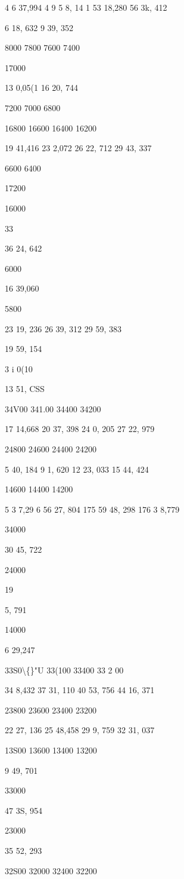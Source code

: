 \documentclass[10pt,a4paper]{article}
\begin{document}
4 6 37,994
4 9 5 8, 14 1
53 18,280
56 3k, 412

6 18, 632
9 39, 352

8000
7800
7600
7400

17000

13 0,05(1
16 20, 744

7200
7000
6800

16800
16600
16400
16200

19 41,416
23
2,072
26 22, 712
29 43, 337

6600
6400

17200

16000

33

36 24, 642

6000

16 39,060

5800

23 19, 236
26 39, 312
29 59, 383

19 59, 154

3 i 0(10

13 51, CSS

34V00
341.00
34400
34200

17 14,668
20 37, 398
24
0, 205
27 22, 979

24800
24600
24400
24200

5 40, 184
9 1, 620
12 23, 033
15 44, 424

14600
14400
14200

5 3 7,29 6
56 27, 804
175 59 48, 298
176
3 8,779

34000

30 45, 722

24000

19

5, 791

14000

6 29,247

33S0\textbackslash\{\}"U
33(100
33400
33 2 00

34
8,432
37 31, 110
40 53, 756
44 16, 371

23800
23600
23400
23200

22 27, 136
25 48,458
29 9, 759
32 31, 037

13S00
13600
13400
13200

9 49, 701

33000

47 3S, 954

23000

35 52, 293

32S00
32000
32400
32200
\end{document}
